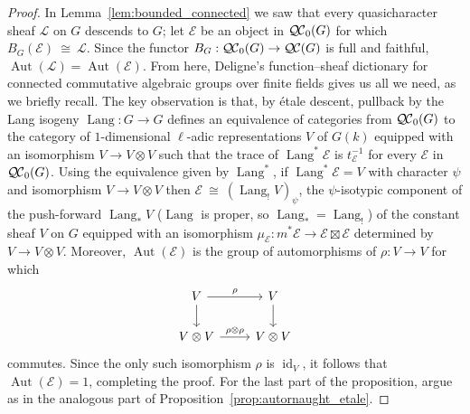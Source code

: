 \documentclass{amsart}
\theoremstyle{plain}
\theoremstyle{definition}
\theoremstyle{remark}
\newcommand{\Fq}{k}
\DeclareMathOperator{\Aut}{Aut}
\DeclareMathOperator{\id}{id}
\DeclareMathOperator{\Lang}{Lang}
\newcommand{\iso}{{\ \cong\ }}
\newcommand{\trFrob}[1]{t_{#1}}
\newcommand{\qcs}[1]{{\mathcal{#1}}}
\newcommand{\QC}{{\mathcal{Q\hskip-0.8pt C}}}
\newcommand{\bQC}{{\QC_0}}
\begin{document}
\begin{proof}
In Lemma~\ref{lem:bounded_connected} we saw that every quasicharacter sheaf $\qcs{L}$ on $G$ descends to $G$; let $\qcs{E}$ be an object in $\bQC(G)$ for which $B_G(\qcs{E}) \iso \qcs{L}$.
 Since the functor $B_G : \bQC(G) \to \QC(G)$ is full and faithful, $\Aut(\qcs{L}) = \Aut(\qcs{E})$.
From here, Deligne's function--sheaf dictionary for connected commutative algebraic groups over finite fields   gives us all we need, as we briefly recall.
The key observation is that, by étale descent, pullback by the Lang isogeny $\Lang : G\to G$ defines an equivalence of categories from $\bQC(G)$ to the category of $1$-dimensional $\ell$-adic representations $V$ of $G(\Fq)$ equipped with an isomorphism $V \to V\otimes V$ such that the trace of $\Lang^*\qcs{E}$ is $\trFrob{\qcs{E}}^{-1}$ for every $\qcs{E}$ in $\bQC(G)$. 
Using the equivalence given by $\Lang^*$, if $\Lang^*\qcs{E} = V$ with character $\psi$ and isomorphism $V\to V\otimes V$ then 
$\qcs{E} \iso (\Lang_! V)_\psi$, the $\psi$-isotypic component of the push-forward $\Lang_* V$ ($\Lang$ is proper, so $\Lang_* = \Lang_!$) of the constant sheaf $V$ on $G$ equipped with an isomorphism $\mu_\qcs{E} : m^* \qcs{E} \to \qcs{E} \boxtimes\qcs{E}$ determined by $V\to V\otimes V$. 
Moreover, $\Aut(\qcs{E})$ is the group of automorphisms of $\rho : V\to V$ for which 
\[
\begin{tikzcd}
\arrow{d}{} V \arrow{r}{\rho} & V\arrow{d}{}\\
V\otimes V \arrow{r}{\rho\otimes \rho} & V\otimes V
\end{tikzcd}
\]
commutes. 
Since the only such isomorphism $\rho$ is $\id_V$, it follows that $\Aut(\qcs{E}) = 1$, completing the proof.
For the last part of the proposition, argue as in the analogous part of Proposition~\ref{prop:autornaught_etale}.
\end{proof}
\end{document}
